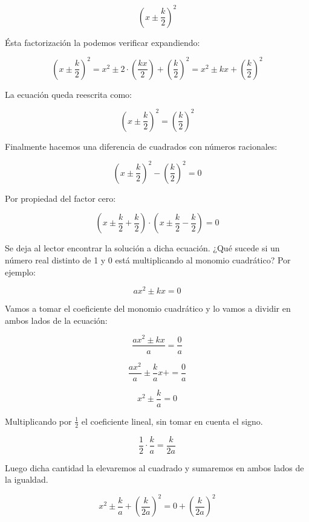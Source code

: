 \documentclass[A4paper, 10pt, oneside]{book}
\begin{document}
	$$\left(x\pm \frac{k}{2}\right)^2$$
	
	Ésta factorización la podemos verificar expandiendo:\newline
	
	$$\left(x\pm \frac{k}{2}\right)^2 = x^2\pm2\cdot \left(\frac{kx}{2}\right) + \left(\frac{k}{2}\right)^2 = x^2 \pm kx + \left(\frac{k}{2}\right)^2$$\newline
	
	La ecuación queda reescrita como:\newline
	
	$$\left(x\pm \frac{k}{2}\right)^2=\left(\frac{k}{2}\right)^2$$\newline
	
	Finalmente hacemos una diferencia de cuadrados con números racionales:\newline
	
	$$\left(x\pm \frac{k}{2}\right)^2-\left(\frac{k}{2}\right)^2=0$$\newline
	
	Por propiedad del factor cero:\newline
	
	$$\left(x\pm \frac{k}{2}+\frac{k}{2}\right)\cdot \left(x\pm \frac{k}{2}-\frac{k}{2}\right)=0$$\newline
	
	Se deja al lector encontrar la solución a dicha ecuación. ¿Qué sucede si un número real distinto de 1 y 0 está multiplicando al monomio cuadrático? Por ejemplo:
	
	$$ax^2 \pm kx = 0$$\newline
	
	Vamos a tomar el coeficiente del monomio cuadrático y lo vamos a dividir en ambos lados de la ecuación: \newline 
	
	$$\frac{ax^2 \pm kx}{a} = \frac{0}{a}$$
	
	$$\frac{ax^2}{a} \pm \frac{k}{a}x +  = \frac{0}{a}$$
	
	$$x^2 \pm \frac{k}{a} = 0$$
	
	Multiplicando por $\displaystyle{\frac{1}{2}}$ el coeficiente lineal, sin tomar en cuenta el signo. \newline
	
	$$\frac{1}{2}\cdot \frac{k}{a} = \frac{k}{2a}$$
	
	Luego dicha cantidad la elevaremos al cuadrado y sumaremos en ambos lados de la igualdad.\newline
	
	$$x^2 \pm \frac{k}{a} + \left(\frac{k}{2a}\right)^2 = 0 + \left(\frac{k}{2a}\right)^2$$
	
\end{document}
